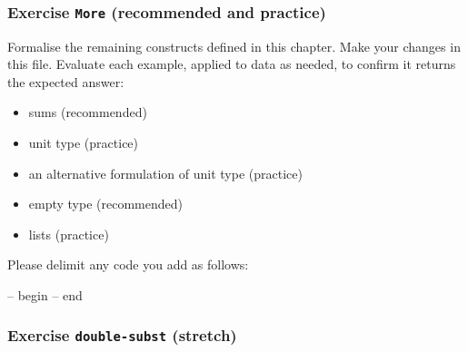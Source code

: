 \begin{fence}
\begin{code}
\AgdaOperator{\AgdaFunction{\#}}\AgdaSpace{}%
\AgdaSpace{}%
\<%
\\
%
\>[3]\AgdaSpace{}%
\AgdaSpace{}%
\AgdaSpace{}%
\AgdaSpace{}%
\<%
\\
\>[3][@{}l@{\AgdaIndent{0}}]%
\>[5]\AgdaSpace{}%
\AgdaSpace{}%
\AgdaOperator{\AgdaInductiveConstructor{,}}\AgdaSpace{}%
\AgdaSpace{}%
\AgdaSpace{}%
\<%
\\
%
\>[3]\<%
\end{code}
\end{fence}

\hypertarget{exercise-more-recommended-and-practice}{%
\subsubsection{\texorpdfstring{Exercise \texttt{More} (recommended and
practice)}{Exercise More (recommended and practice)}}\label{exercise-more-recommended-and-practice}}

Formalise the remaining constructs defined in this chapter. Make your
changes in this file. Evaluate each example, applied to data as needed,
to confirm it returns the expected answer:

\begin{itemize}
\tightlist
\item
  sums (recommended)
\item
  unit type (practice)
\item
  an alternative formulation of unit type (practice)
\item
  empty type (recommended)
\item
  lists (practice)
\end{itemize}

Please delimit any code you add as follows:

\begin{myDisplay}
-- begin
-- end
\end{myDisplay}

\hypertarget{exercise-double-subst-stretch}{%
\subsubsection{\texorpdfstring{Exercise \texttt{double-subst}
(stretch)}{Exercise double-subst (stretch)}}\label{exercise-double-subst-stretch}}

